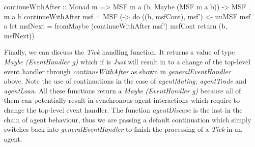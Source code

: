 \begin{HaskellCode}
continueWithAfter :: Monad m => MSF m a (b, Maybe (MSF m a b)) -> MSF m a b
continueWithAfter msf = MSF (\a -> do
  ((b, msfCont), msf') <- unMSF msf a
  let msfNext = fromMaybe (continueWithAfter msf') msfCont
  return (b, msfNext))
\end{HaskellCode}

Finally, we can discuss the \textit{Tick} handling function. It returns a value of type \textit{Maybe (EventHandler g)} which if is \textit{Just} will result in to a change of the top-level event handler through \textit{continueWithAfter} as shown in \textit{generalEventHandler} above. Note the use of continuations in the case of \textit{agentMating, agentTrade} and  \textit{agentLoan}. All these functions return a \textit{Maybe (EventHandler g)} because all of them can potentially result in synchronous agent interactions which require to change the top-level event handler. The function \textit{agentDisease} is the last in the chain of agent behaviour, thus we are passing a default continuation which simply switches back into \textit{generalEventHandler} to finish the processing of a \textit{Tick} in an agent.

